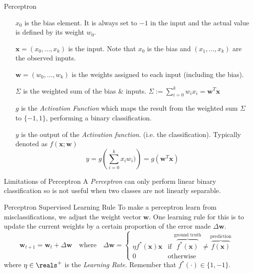 \documentclass[11pt,a4paper]{article}
\begin{document}
\begin{definition}{Perceptron}
\begin{center}
\end{center}
    \begin{itemize}
      \item[$x_0$] is the bias element. It is always set to $-1$ in the input and the actual value is defined by its weight $w_0$.
      \item[$\pmb{x}=(x_0,\dots,x_k)$] is the input. Note that $x_0$ is the bias and  $(x_1,\dots,x_k)$ are the observed inputs.
      \item[$\pmb{w}=(w_0,\dots,w_k)$] is the weights assigned to each input (including the bias).
      \item[$\Sigma$] is the weighted sum of the bias \& inputs. $\displaystyle\Sigma:=\sum_{i=0}^kw_ix_i=\pmb{w}^T\pmb{x}$
      \item[$g$] is the \textit{Activation Function} which maps the result from the weighted sum $\Sigma$ to $\{-1,1\}$, performing a binary classification.
      \item[$y$] is the output of the \textit{Activation function}. (i.e. the classification). Typically denoted as $f(\pmb{x};\pmb{w})$ \[ y=g\left(\sum_{i=0}^kx_iw_i)\right)=g(\pmb{w}^T\pmb{x})\]
    \end{itemize}
  \end{definition}

  \begin{remark}{Limitations of Perceptron}
    A \textit{Perceptron} can only perform linear binary classification so is not useful when two classes are not linearly separable.
  \end{remark}

  \begin{proposition}{Perceptron Supervised Learning Rule}
    To make a perceptron learn from misclassifications, we adjust the weight vector $\mathbf{w}$. One learning rule for this is to update the current weights by a certain proportion of the error made $\Delta \mathbf{w}$.
    \[ \pmb{w}_{t+1}=\pmb{w}_t+\Delta\pmb{w}\quad\text{where}\quad\Delta\pmb{w}=\begin{cases}\eta f^*(\pmb{x})\pmb{x}&\text{if }\overbrace{f^*(\pmb{x})}^\text{ground truth}\neq \overbrace{f(\pmb{x})}^\text{prediction}\\0&\text{otherwise}\end{cases}\]
    where $\eta\in\reals^+$ is the \textit{Learning Rate}. Remember that $f^*(\cdot)\in\{1,-1\}$.
  \end{proposition}
\end{document}
